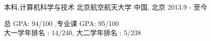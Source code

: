


\begin{cventries}


\cventry
{本科,计算机科学与技术} %
{北京航空航天大学} %
{中国, 北京} %
{2013.9 - 至今} %
{ %
\begin{cvitems}
\item {
	总 	GPA: 94/100 ,专业课 		GPA: 95/100\\
	大一学年排名   	: 14/240, 大二学年排名 	: 5/238}
\end{cvitems}
}


\end{cventries}